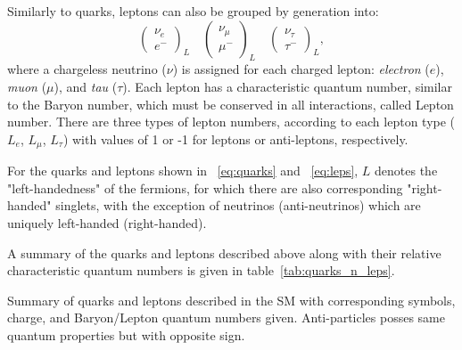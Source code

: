 		Similarly to quarks, leptons can also be grouped by generation into:
		\begin{equation}
			\begin{pmatrix} \nu_e      \\ e^-    \end{pmatrix}_L \quad
			\begin{pmatrix} \nu_{\mu}  \\ \mu^-  \end{pmatrix}_L \quad
			\begin{pmatrix} \nu_{\tau} \\ \tau^-  \end{pmatrix}_L,
			\label{eq:leps}
		\end{equation}
		where a chargeless neutrino ($\nu$) is assigned for each charged lepton: \textit{electron} ($e$), \textit{muon} ($\mu$), and \textit{tau} ($\tau$). Each lepton has a characteristic quantum number, similar to the Baryon number, which must be conserved in all interactions, called Lepton number. There are three types of lepton numbers, according to each lepton type ($L_e$, $L_{\mu}$, $L_{\tau}$) with values of 1 or -1 for leptons or anti-leptons, respectively.
		
		For the quarks and leptons shown in ~\ref{eq:quarks} and ~\ref{eq:leps}, $L$ denotes the "left-handedness" of the fermions, for which there are also corresponding "right-handed" singlets, with the exception of neutrinos (anti-neutrinos) which are uniquely left-handed (right-handed).
		
		A summary of the quarks and leptons described above along with their relative characteristic quantum numbers is given in table~\ref{tab:quarks_n_leps}.
	\begin{table}[!hbt]
	\centering
	\caption{Summary of quarks and leptons described in the \ac{SM} with corresponding symbols, charge, and Baryon/Lepton quantum numbers given. Anti-particles posses same quantum properties but with opposite sign.}
	\resizebox{\textwidth}{!}{
		
	\quad
		
	}
	\label{tab:quarks_n_leps}
	\end{table}
	
	

